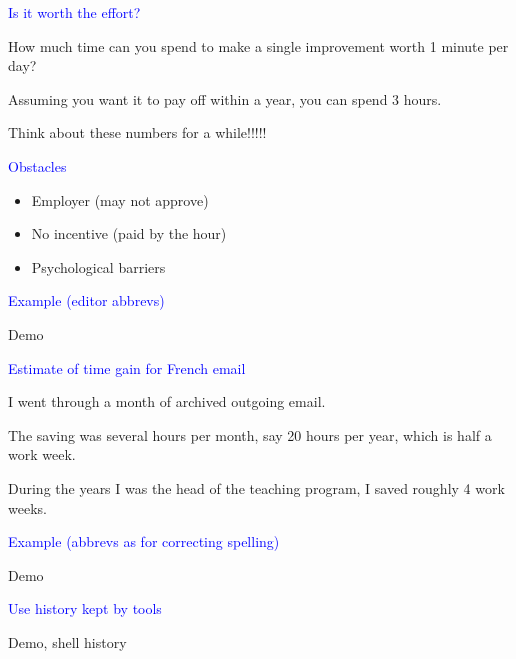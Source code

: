 \documentclass{slides}
\newcommand{\ti}[1]{\begin{center}\Large{\textcolor{blue}{#1}}\end{center}}
\begin{document}
\begin{slide}\ti{Is it worth the effort?}

How much time can you spend to make a single improvement worth 1
minute per day?

Assuming you want it to pay off within a year, you can spend 3 hours.

Think about these numbers for a while!!!!!

\vfill\end{slide}
\begin{slide}\ti{Obstacles}

  \begin{itemize}
  \item Employer (may not approve)
  \item No incentive (paid by the hour)
  \item Psychological barriers
  \end{itemize}

\vfill\end{slide}
\begin{slide}\ti{Example (editor abbrevs)}

Demo

\vfill\end{slide}
\begin{slide}\ti{Estimate of time gain for French email}

I went through a month of archived outgoing email.

The saving was several hours per month, say 20 hours per year, which
is half a work week.

During the years I was the head of the teaching program, I saved
roughly 4 work weeks.

\vfill\end{slide}
\begin{slide}\ti{Example (abbrevs as for correcting spelling)}

Demo

\vfill\end{slide}
\begin{slide}\ti{Use history kept by tools}

Demo, shell history

\vfill\end{slide}
\end{document}
